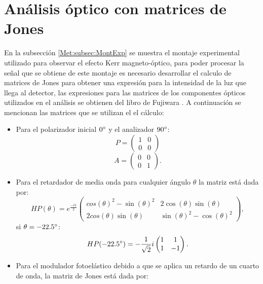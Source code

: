\chapter{An\'alisis \'optico con matrices de Jones} \label{Jones:App}
En la subsecci\'on \ref{Met:subsec:MontExp} se muestra el montaje experimental utilizado para observar el efecto Kerr magneto-\'optico, para poder procesar la se\~nal que se obtiene de este montaje es necesario desarrollar el calculo de matrices de Jones para obtener una expresi\'on para la intensidad de la luz que llega al detector, las expresiones para las matrices de los componentes \'opticos utilizados en el an\'alisis se obtienen del libro de Fujiwara \cite{fuji_2005}.
\newline
A continuación se mencionan las matrices que se utilizan el el c\'alculo:
\begin{itemize}
	\item Para el polarizador inicial $0 \degree $ y el analizador $90 \degree$:
	\begin{equation}
	P=
	\begin{pmatrix}
	1&0\\
	0&0
	\end{pmatrix}
	\label{Jones:ec:pol}
	\end{equation}
	\begin{equation}
	A=
	\begin{pmatrix}
	0&0\\
	0&1
	\end{pmatrix}.
	\label{Jones:ec:An}
	\end{equation}
	\item Para el retardador de media onda para cualquier \'angulo $\theta$ la matriz est\'a dada por:
	\begin{equation}
	HP(\theta)= e^{\frac{-i \pi}{2}}
	\begin{pmatrix}
	cos(\theta)^2 - \sin(\theta)^2 & 2 \cos(\theta) \sin(\theta)\\
	2 cos(\theta) \sin(\theta)     & \sin(\theta)^2-\cos(\theta)^2
	\end{pmatrix},
	\label{Jones:ec:HWP1}
	\end{equation}
	si $\theta=-22.5 \degree$:
	\begin{equation}
	HP(-22.5\degree)= - \frac{1}{\sqrt{2}} i 
	\begin{pmatrix}
	1 & 1\\
	1  & -1
	\end{pmatrix}.
	\label{Jones:ec:HWP2}
	\end{equation}
	\item Para el modulador fotoel\'astico debido a que se aplica un retardo de un cuarto de onda, la matriz de Jones est\'a dada por:

\end{itemize}

